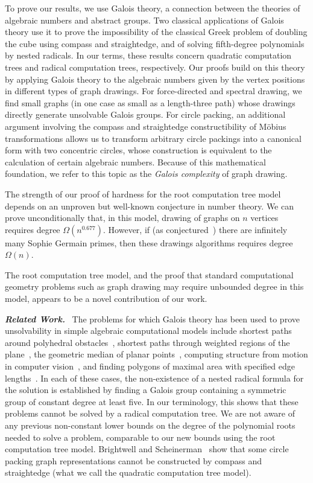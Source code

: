 \documentclass[oribibl,10pt]{llncs}
\newcommand{\Emph}[1]{\smallskip\textbf{\textit{#1}}~}
\begin{document}
To prove our results, we use Galois theory, a connection between the theories of algebraic numbers and abstract groups. 
Two classical applications of Galois theory use it to prove the impossibility of the classical Greek problem of doubling the cube using compass and straightedge, and of solving fifth-degree polynomials by nested radicals. In our terms, these results concern quadratic computation trees and radical computation trees, respectively. 
Our proofs build on this theory by applying Galois theory to the algebraic numbers given by the vertex positions in different types of graph drawings. For force-directed and spectral drawing, we find small graphs (in one case as small as a length-three path) whose drawings directly generate unsolvable Galois groups. For circle packing, an additional argument involving the compass and straightedge constructibility of M\"obius transformations allows us to transform arbitrary circle packings into a canonical form with two concentric circles, whose construction is equivalent to the calculation of certain algebraic numbers.
Because of this mathematical foundation, we refer to this topic as the 
\emph{Galois complexity} of graph drawing.

\ifFull
The strength of our proof of hardness for the root computation tree model depends on an unproven but well-known conjecture in number theory. We can prove unconditionally that, in this model, drawing of graphs on $n$ vertices requires degree $\Omega(n^{0.677})$. However, if (as conjectured~\cite{Sho-CINTA-09}) there are infinitely many Sophie Germain primes, then these drawings algorithms requires degree $\Omega(n)$.

The root computation tree model, and the proof that standard computational geometry problems such as graph drawing may require unbounded degree in this model, appears to be a novel contribution of our work.
\fi

\Emph{Related Work.}
The problems for which
Galois theory has been used to prove unsolvability in
simple algebraic computational models include
shortest paths around polyhedral obstacles~\cite{Baj-Pol-1985}, shortest paths through weighted regions of the plane~\cite{CarGriMah-2013},
the geometric median of planar points~\cite{Baj-DCG-1988},
computing structure from motion in computer vision~\cite{NisHarSte-CVPR-2007},
and finding polygons of maximal area with specified edge lengths~\cite{Var-SB-2004}.
In each of these cases, the non-existence of a nested radical formula for the solution is established by finding a Galois group containing a symmetric group of constant degree at least five. In our terminology, this shows that these problems cannot be solved by a radical computation tree.
We are not aware of any previous non-constant lower bounds on the degree of the polynomial roots needed to solve a problem, comparable to our new bounds using the root computation tree model.
Brightwell and Scheinerman~\cite{BriSch-SJDM-93} show that some 
circle packing graph representations cannot be constructed by compass and straightedge
(what we call the quadratic computation tree model).
\end{document}
